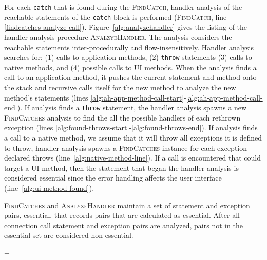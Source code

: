 For each \lstinline!catch! that is found during the
\textsc{FindCatch}, handler analysis of the reachable statements of
the \lstinline!catch! block is performed (\textsc{FindCatch}, line
\ref{findcatches-analyze-call}).  Figure~\ref{alg:analyzehandler}
gives the listing of the handler analysis procedure
\textsc{AnalzyeHandler}. The analysis considers the reachable
statements inter-procedurally and flow-insensitively.  Handler
analysis searches for: (1) calls to application methods, (2)
\lstinline!throw! statements (3) calls to native methods, and (4)
possible calls to UI methods. When the analysis finds a call to an
application method, it pushes the current statement and method onto
the stack and recursive calls itself for the new method to analyze the
new method's statements (lines
\ref{alg:ah-app-method-call-start}-\ref{alg:ah-app-method-call-end}).
If analysis finds a \lstinline!throw!  statement, the handler analysis
spawns a new \textsc{FindCatches} analysis to find the all the
possible handlers of each rethrown exception (lines
\ref{alg:found-throws-start}-\ref{alg:found-throws-end}).  If analysis
finds a call to a native method, we assume that it will throw all
exceptions it is defined to throw, handler analysis spawns a
\textsc{FindCatches} instance for each exception declared throws
(line~\ref{alg:native-method-line}).  If a call is encountered that
could target a UI method, then the statement that began the handler
analysis is considered essential since the error handling affects the
user interface (line~\ref{alg:ui-method-found}).

\textsc{FindCatches} and \textsc{AnalyzeHandler} maintain a set of
statement and exception pairs, essential, that records pairs that are
calculated as essential.  After all connection call statement and
exception pairs are analyzed, pairs not in the essential set are
considered non-essential.

\lstMakeShortInline[basicstyle=\scriptsize\ttfamily,keywordstyle=\color{DarkPurple},breaklines=true]+

